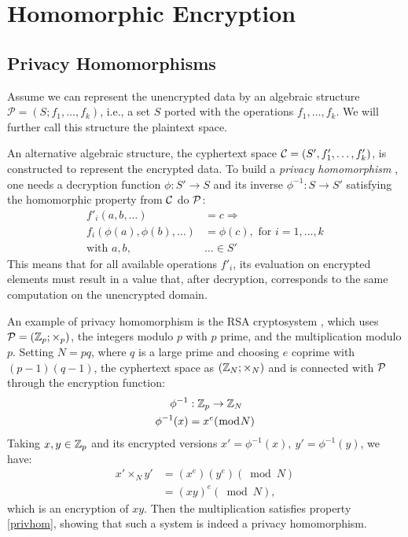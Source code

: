 \chapter{Homomorphic Encryption}

\section{Privacy Homomorphisms}

Assume we can represent the unencrypted data by an algebraic structure $\mathcal P= (S;f_1,\ldots,f_k)$, i.e., a set $S$ ported with the operations $f_1,\ldots,f_k$. We will further call this structure the plaintext space.

An alternative algebraic structure, the cyphertext space $\mathcal C=(S',f'_1,\ldots,f'_k)$, is constructed to represent the encrypted data. To build a \textit{privacy homomorphism} \cite{Rivest1978},  one needs a decryption function $\phi:S'\to S$ and its inverse $\phi^{-1}:S\to S'$ satisfying the homomorphic property from $\mathcal C$ do $\mathcal P$:
\begin{align}
    \label{privhom}
    f'_i(a,b,\ldots)&=c\Rightarrow\nonumber\\ f_i(\phi(a),\phi(b),\ldots)&=\phi(c),\text{ for } i=1,\ldots,k\\
    \text{with }a,b,&\ldots\in S'\nonumber
\end{align}
This means that for all available operations $f'_i$, its evaluation on encrypted elements must result in a value that, after decryption, corresponds to the same computation on the unencrypted domain.

An example of privacy homomorphism is the RSA cryptosystem \cite{rsa}, which uses $\mathcal P = (\mathbb{Z}_p;\times_p)$, the integers modulo $p$ with $p$ prime, and the multiplication modulo $p$. Setting $N=pq$, where $q$ is a large prime and choosing $e$ coprime with $(p-1)(q-1)$,  the cyphertext space as $(\mathbb{Z}_N;\times_N)$ and is connected with $\mathcal P$ through the encryption function:
\begin{align*}
    \phi^{-1}&:\mathbb{Z}_p\to\mathbb{Z}_N\\
    \phi^{-1}(x)&=x^e(\bmod N)
\end{align*}
Taking $x,y\in\mathbb{Z}_p$ and its encrypted versions $x'=\phi^{-1}(x),~y'=\phi^{-1}(y)$, we have:
\begin{align*}
    x'\times_N y'&= (x^e)(y^e)(\bmod N)\\
    &=(xy)^e(\bmod N),
\end{align*}
which is an encryption of $xy$. Then the multiplication satisfies property \ref{privhom}, showing that such a system is indeed a privacy homomorphism.

